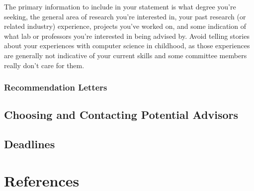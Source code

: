 \documentclass[12pt]{article}
\begin{document}
The primary information to include in your statement is what degree you're seeking, the general area of research you're interested in, your past research (or related industry) experience, projects you've worked on, and some indication of what lab or professors you're interested in being advised by. Avoid telling stories about your experiences with computer science in childhood, as those experiences are generally not indicative of your current skills and some committee members really don't care for them. \cite{mightgradguide,vasansop}

\subsubsection{Recommendation Letters}

\subsection{Choosing and Contacting Potential Advisors} \label{coldemail}

\subsection{Deadlines}

\section{References}

\printbibliography[heading=none]
\end{document}
